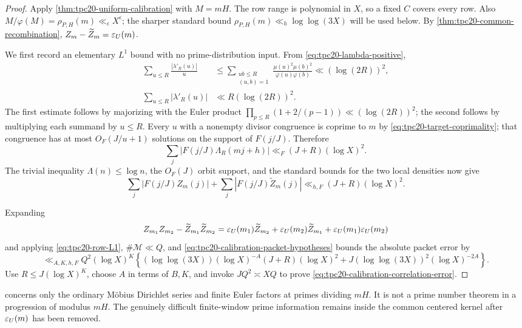 \begin{proof}
Apply \cref{thm:tpc20-uniform-calibration} with \(M=mH\).
The row range is polynomial in \(X\), so a fixed \(C\) covers every
row.  Also \(M/\varphi(M)=\rho_{P,H}(m)\ll_\epsilon X^\epsilon\);
the sharper standard bound
\(\rho_{P,H}(m)\ll_h\log\log(3X)\) will be used below.
By \cref{thm:tpc20-common-recombination},
\(Z_m-\widetilde Z_m=\varepsilon_U(m)\).

We first record an elementary \(L^1\) bound with no prime-distribution
input.  From \eqref{eq:tpc20-lambda-positive},
\begin{align}
 \sum_{u\le R}\frac{|\lambda'_R(u)|}{u}
 &\le
 \sum_{\substack{ub\le R\\(u,b)=1}}
 \frac{\mu(u)^2\mu(b)^2}{\varphi(u)\varphi(b)}
 \ll(\log(2R))^2,
 \label{eq:tpc20-lambda-l1-over-u}\\
 \sum_{u\le R}|\lambda'_R(u)|
 &\ll R(\log(2R))^2.
 \label{eq:tpc20-lambda-l1}
\end{align}
The first estimate follows by majorizing with the Euler product
\(\prod_{p\le R}(1+2/(p-1))\ll(\log(2R))^2\); the second follows by
multiplying each summand by \(u\le R\).  Every \(u\) with a nonempty
divisor congruence is coprime to \(m\) by
\eqref{eq:tpc20-target-coprimality}; that congruence has at most
\(O_F(J/u+1)\) solutions on the support of \(F(j/J)\).  Therefore
\[
 \sum_j|F(j/J)\Lambda_R(mj+h)|
 \ll_F(J+R)(\log X)^2.
\]
The trivial inequality
\(\Lambda(n)\le\log n\), the \(O_F(J)\) orbit support, and the standard
bounds for the two local densities now give
\begin{equation}
 \sum_j|F(j/J)Z_m(j)|
 +\sum_j|F(j/J)\widetilde Z_m(j)|
 \ll_{h,F}(J+R)(\log X)^2.
 \label{eq:tpc20-row-L1}
\end{equation}

Expanding
\[
 Z_{m_1}Z_{m_2}-\widetilde Z_{m_1}\widetilde Z_{m_2}
 =\varepsilon_U(m_1)\widetilde Z_{m_2}
  +\varepsilon_U(m_2)\widetilde Z_{m_1}
  +\varepsilon_U(m_1)\varepsilon_U(m_2)
\]
and applying \eqref{eq:tpc20-row-L1},
\(\#\mathscr M\ll Q\), and
\eqref{eq:tpc20-calibration-packet-hypotheses} bounds the absolute
packet error by
\[
 \ll_{A,K,h,F}
 Q^2(\log X)^K
 \left\{
  (\log\log(3X))(\log X)^{-A}(J+R)(\log X)^2
  +J(\log\log(3X))^2(\log X)^{-2A}
 \right\}.
\]
Use \(R\le J(\log X)^K\), choose \(A\) in terms of \(B,K\), and invoke
\(JQ^2\asymp XQ\) to prove
\eqref{eq:tpc20-calibration-correlation-error}.
\end{proof}

\begin{remark}
\label{rem:tpc20-no-PNT-AP}
 concerns only the ordinary
M\"obius Dirichlet series and finite Euler factors at primes dividing
\(mH\).  It is not a prime number theorem in a progression of modulus
\(mH\).  The genuinely difficult finite-window prime information
remains inside the common centered kernel after
\(\varepsilon_U(m)\) has been removed.
\end{remark}
